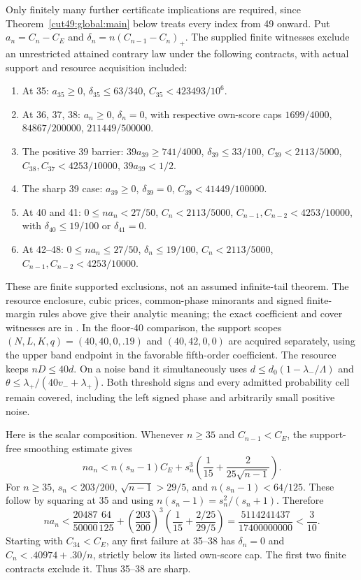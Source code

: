 \documentclass[11pt,a4paper]{article}
\numberwithin{equation}{section}
\theoremstyle{definition}
\theoremstyle{remark}
\begin{document}
Only finitely many further certificate implications are required,
since Theorem~\ref{cut49:global:main} below treats every index
from 49 onward. Put \(a_n=C_n-C_E\) and
\(\delta_n=n(C_{n-1}-C_n)_+\). The supplied finite witnesses
exclude an unrestricted attained contrary law under the following
contracts, with actual support and resource acquisition included:
\begin{enumerate}[leftmargin=*]
\item At 35: \(a_{35}\ge0\), \(\delta_{35}\le63/340\),
\(C_{35}<423493/10^6\).
\item At 36, 37, 38: \(a_n\ge0\), \(\delta_n=0\), with
respective own-score caps
\(1699/4000\), \(84867/200000\), \(211449/500000\).
\item The positive 39 barrier: \(39a_{39}\ge741/4000\),
\(\delta_{39}\le33/100\), \(C_{39}<2113/5000\),
\(C_{38},C_{37}<4253/10000\), \(39a_{39}<1/2\).
\item The sharp 39 case: \(a_{39}\ge0\), \(\delta_{39}=0\),
\(C_{39}<41449/100000\).
\item At 40 and 41: \(0\le na_n<27/50\),
\(C_n<2113/5000\), \(C_{n-1},C_{n-2}<4253/10000\),
with \(\delta_{40}\le19/100\) or \(\delta_{41}=0\).
\item At 42--48: \(0\le na_n\le27/50\),
\(\delta_n\le19/100\), \(C_n<2113/5000\),
\(C_{n-1},C_{n-2}<4253/10000\).
\end{enumerate}
These are finite supported exclusions, not an assumed infinite-tail
theorem. The resource enclosure, cubic prices, common-phase
minorants and signed finite-margin rules above give their analytic
meaning; the exact coefficient and cover witnesses are in
\cite{EffectiveSupplement}. In the floor-40 comparison, the
support scopes \((N,L,K,q)=(40,40,0,.19)\) and
\((40,42,0,0)\) are acquired separately, using the upper band
endpoint in the favorable fifth-order coefficient.
The resource keeps \(nD\le40d\). On a noise band it simultaneously
uses \(d\le d_0(1-\lambda_-/\Lambda)\) and
\(\theta\le\lambda_+/(40v_-+\lambda_+)\).
Both threshold signs and every admitted probability cell remain
covered, including the left signed phase and arbitrarily small
positive noise.

Here is the scalar composition. Whenever \(n\ge35\) and
\(C_{n-1}<C_E\), the support-free smoothing estimate gives
\[
 na_n<n(s_n-1)C_E+s_n^3
       \left(\frac1{15}+\frac{2}{25\sqrt{n-1}}\right).
\]
For \(n\ge35\), \(s_n<203/200\),
\(\sqrt{n-1}>29/5\), and \(n(s_n-1)<64/125\).
These follow by squaring at 35 and using
\(n(s_n-1)=s_n^2/(s_n+1)\). Therefore
\[
 na_n<\frac{20487}{50000}\frac{64}{125}
       +\left(\frac{203}{200}\right)^3
        \left(\frac1{15}+\frac{2/25}{29/5}\right)
 =\frac{5114241437}{17400000000}<\frac3{10}.
\]
Starting with \(C_{34}<C_E\), any first failure at 35--38 has
\(\delta_n=0\) and \(C_n<.40974+.30/n\), strictly below its
listed own-score cap. The first two finite contracts exclude it.
Thus 35--38 are sharp.
\end{document}
